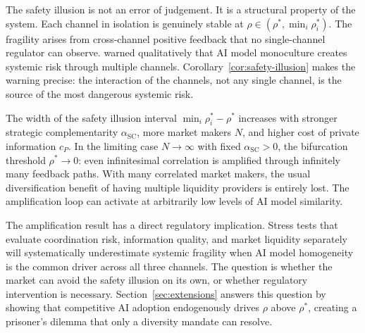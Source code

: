 The safety illusion is not an error of judgement. It is a structural property of the system. Each channel in isolation is genuinely stable at $\rho \in (\rho^*, \min_i \rho_i^*)$. The fragility arises from cross-channel positive feedback that no single-channel regulator can observe. \citet{danielsson2022} warned qualitatively that AI model monoculture creates systemic risk through multiple channels. Corollary~\ref{cor:safety-illusion} makes the warning precise: the interaction of the channels, not any single channel, is the source of the most dangerous systemic risk.

The width of the safety illusion interval $\min_i \rho_i^* - \rho^*$ increases with stronger strategic complementarity $\alpha_{\text{SC}}$, more market makers $N$, and higher cost of private information $c_P$. In the limiting case $N \to \infty$ with fixed $\alpha_{\text{SC}} > 0$, the bifurcation threshold $\rho^* \to 0$: even infinitesimal correlation is amplified through infinitely many feedback paths. With many correlated market makers, the usual diversification benefit of having multiple liquidity providers is entirely lost. The amplification loop can activate at arbitrarily low levels of AI model similarity.

The amplification result has a direct regulatory implication. Stress tests that evaluate coordination risk, information quality, and market liquidity separately will systematically underestimate systemic fragility when AI model homogeneity is the common driver across all three channels. The question is whether the market can avoid the safety illusion on its own, or whether regulatory intervention is necessary. Section~\ref{sec:extensions} answers this question by showing that competitive AI adoption endogenously drives $\rho$ above $\rho^*$, creating a prisoner's dilemma that only a diversity mandate can resolve.
